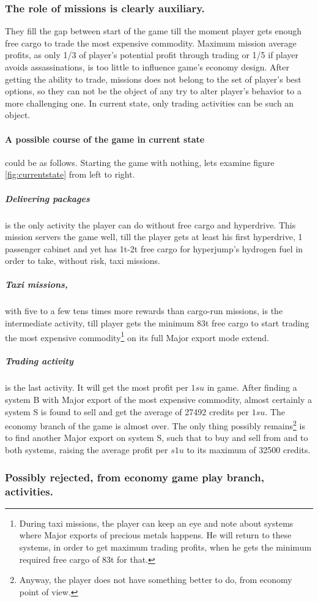 \documentclass[]{article}
\begin{document}
\subsubsection{The role of missions is clearly auxiliary.}They fill the gap between start of the game till the moment player gets enough free cargo to trade the most expensive commodity. Maximum mission average profits, as only  1/3 of player's potential profit through trading or  1/5 if player avoids assassinations, is too little to influence game's economy design. After getting the ability to trade, missions does not belong to the set of player's best options, so they can not be the object of any try to alter player's behavior to a more challenging one. In current state, only trading activities can be such an object.
\paragraph{A possible course of the game in current state} could be as follows. Starting the game with nothing, lets examine figure \ref{fig:currentstate} from left to right.
\subparagraph{Delivering packages} is the only activity the player can do without free cargo and hyperdrive. This mission servers the game well, till the player gets at least his first hyperdrive, 1 passenger cabinet and yet has 1t-2t free cargo for hyperjump's hydrogen fuel in order to take, without risk, taxi missions.
\subparagraph{Taxi missions,} with five to a few tens  times more rewards than cargo-run missions, is the intermediate activity, till player gets the minimum 83t free cargo to start trading the most expensive commodity\footnote{During taxi missions, the player can keep an eye and note about systems where Major exports of precious metals happens. He will return to these systems, in order to get maximum trading profits, when he gets the minimum required free cargo of 83t for that.} on its full Major export mode extend.
\subparagraph{Trading activity} is the last activity. It will get the most profit per $1su$ in game. After finding a system B with Major export of the most expensive commodity, almost certainly a system S is found to sell and get the average of 27492 credits per $1su.$ The economy branch of the game is almost over. The only thing possibly remains\footnote{Anyway, the player does not have something better to do, from economy point of view.} is to find another Major export on system S, such that to buy and sell from and to both systems, raising the average profit per $s1u$ to its maximum of 32500 credits.
\subsubsection{Possibly rejected, from economy game play branch, activities.}
\end{document}
